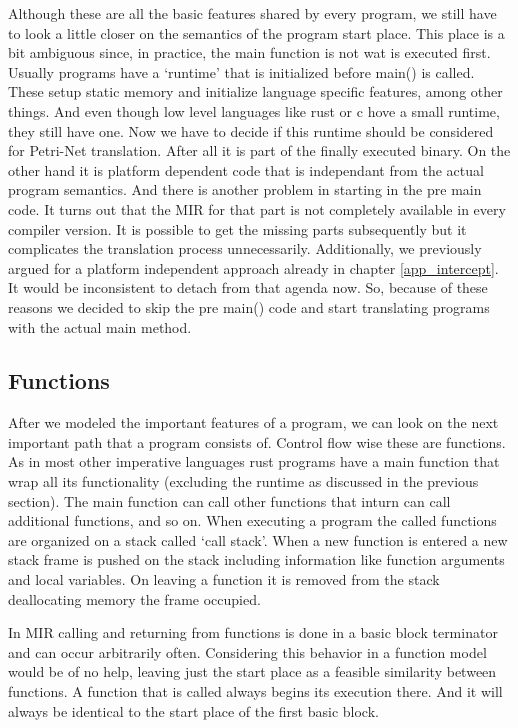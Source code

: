 Although these are all the basic features shared by every program, we still have to look a little closer on the semantics of the program start place.
This place is a bit ambiguous since, in practice, the main function is not wat is executed first.
Usually programs have a `runtime' that is initialized before main() is called.
These setup static memory and initialize language specific features, among other things.
And even though low level languages like rust or c hove a small runtime, they still have one.
Now we have to decide if this runtime should be considered for Petri-Net translation.
After all it is part of the finally executed binary.
On the other hand it is platform dependent code that is independant from the actual program semantics.
And there is another problem in starting in the pre main code.
It turns out that the MIR for that part is not completely available in every compiler version.
It is possible to get the missing parts subsequently but it complicates the translation process unnecessarily.
Additionally, we previously argued for a platform independent approach already in chapter \ref{app_intercept}.
It would be inconsistent to detach from that agenda now.
So, because of these reasons we decided to skip the pre main() code and start translating programs with the actual main method.

\subsection{Functions}
After we modeled the important features of a program, we can look on the next important path that a program consists of.
Control flow wise these are functions.
As in most other imperative languages rust programs have a main function that wrap all its functionality (excluding the runtime as discussed in the previous section).
The main function can call other functions that inturn can call additional functions, and so on.
When executing a program the called functions are organized on a stack called `call stack'.
When a new function is entered a new stack frame is pushed on the stack including information like function arguments and local variables.
On leaving a function it is removed from the stack deallocating memory the frame occupied.

In MIR calling and returning from functions is done in a basic block terminator and can occur arbitrarily often.
Considering this behavior in a function model would be of no help, leaving just the start place as a feasible similarity between functions.
A function that is called always begins its execution there.
And it will always be identical to the start place of the first basic block.

